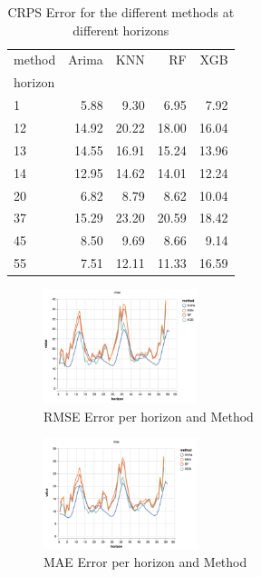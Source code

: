 \documentclass[a4paper,twocolumn,5p]{elsarticle}
\begin{document}
\begin{table}[tbp]
\caption{\label{tab:determ}CRPS Error for the different methods at different
horizons 
}
  \centering
  \begin{tabular}{lrrrr}
    \toprule
    method &  Arima &   KNN &    RF &   XGB \\
    horizon &        &       &       &       \\
    \midrule
    1       &   5.88 &  9.30 &  6.95 &  7.92 \\
    12      &  14.92 & 20.22 & 18.00 & 16.04 \\
    13      &  14.55 & 16.91 & 15.24 & 13.96 \\
    14      &  12.95 & 14.62 & 14.01 & 12.24 \\
    20      &   6.82 &  8.79 &  8.62 & 10.04 \\
    37      &  15.29 & 23.20 & 20.59 & 18.42 \\
    45      &   8.50 &  9.69 &  8.66 &  9.14 \\
    55      &   7.51 & 12.11 & 11.33 & 16.59 \\
    \bottomrule
    \end{tabular}
\end{table}

\begin{figure}
  \caption{RMSE Error per horizon and Method}
  \centering
      \includegraphics[width=0.4\textwidth]{results/rmse}
\end{figure}

\begin{figure}
  \caption{MAE Error per horizon and Method}
  \centering
      \includegraphics[width=0.4\textwidth]{results/mae}
\end{figure}
\end{document}

